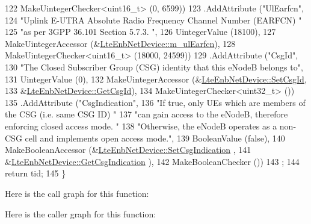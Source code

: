 \begin{DoxyCode}
122                    MakeUintegerChecker<uint16\_t> (0, 6599))
123     .AddAttribute (\textcolor{stringliteral}{"UlEarfcn"},
124                    \textcolor{stringliteral}{"Uplink E-UTRA Absolute Radio Frequency Channel Number (EARFCN) "}
125                    \textcolor{stringliteral}{"as per 3GPP 36.101 Section 5.7.3. "},
126                    UintegerValue (18100),
127                    MakeUintegerAccessor (&\hyperlink{classns3_1_1LteEnbNetDevice_a0760bf2c3e1199b2196c01d99d7221b7}{LteEnbNetDevice::m\_ulEarfcn}),
128                    MakeUintegerChecker<uint16\_t> (18000, 24599))
129     .AddAttribute (\textcolor{stringliteral}{"CsgId"},
130                    \textcolor{stringliteral}{"The Closed Subscriber Group (CSG) identity that this eNodeB belongs to"},
131                    UintegerValue (0),
132                    MakeUintegerAccessor (&\hyperlink{classns3_1_1LteEnbNetDevice_a3295d645fda58a79bddd1a48270119f0}{LteEnbNetDevice::SetCsgId},
133                                          &\hyperlink{classns3_1_1LteEnbNetDevice_ab8d476d8421065acb947d4d037503d00}{LteEnbNetDevice::GetCsgId}),
134                    MakeUintegerChecker<uint32\_t> ())
135     .AddAttribute (\textcolor{stringliteral}{"CsgIndication"},
136                    \textcolor{stringliteral}{"If true, only UEs which are members of the CSG (i.e. same CSG ID) "}
137                    \textcolor{stringliteral}{"can gain access to the eNodeB, therefore enforcing closed access mode. "}
138                    \textcolor{stringliteral}{"Otherwise, the eNodeB operates as a non-CSG cell and implements open access mode."},
139                    BooleanValue (\textcolor{keyword}{false}),
140                    MakeBooleanAccessor (&\hyperlink{classns3_1_1LteEnbNetDevice_a8151f16ad371bd4c2276d99ef80c6f5d}{LteEnbNetDevice::SetCsgIndication}
      ,
141                                         &\hyperlink{classns3_1_1LteEnbNetDevice_aa42650897c28880352cd8f65f305b0b0}{LteEnbNetDevice::GetCsgIndication}
      ),
142                    MakeBooleanChecker ())
143   ;
144   \textcolor{keywordflow}{return} tid;
145 \}
\end{DoxyCode}


Here is the call graph for this function\+:




Here is the caller graph for this function\+:


